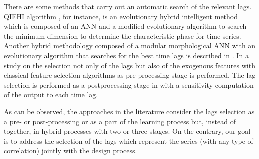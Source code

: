\documentclass[preprint,authoryear,12pt]{elsarticle}
\begin{document}
There are some methods that carry out an automatic search of the relevant lags. QIEHI algorithm \cite{Araujo2010a}, for instance, is an evolutionary hybrid intelligent method which is composed of an ANN and a modified evolutionary algorithm to search the minimum dimension to determine the characteristic phase for time series. %
Another hybrid methodology composed of a modular morphological ANN with an evolutionary algorithm that searches for the best time lags is described in \cite{Araujo2010b}. %
In \cite{garcia2008} a study on the selection not only of the lags but also of the exogenous features with classical feature selection algorithms as pre-processing stage is performed. %
The lag selection is performed as a postprocessing stage in \cite{Maus2011} with a sensitivity computation of the output to each time lag. %

As can be observed, the approaches in the literature consider the lags selection as a pre- or post-processing or as a part of the learning process but, instead of together, in hybrid processes with two or three stages. On the contrary, our goal is to address the selection of the lags which represent the series (with any type of correlation) jointly with the design process.

\end{document}
